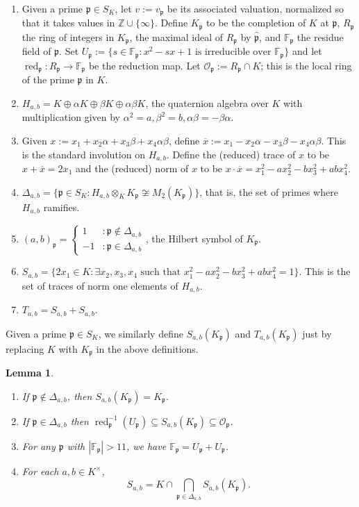 \documentclass[12pt,reqno]{amsart}
\newcommand{\OO}{\mathcal{O}}
\newcommand{\ZZ}{\mathbb{Z}}
\newcommand{\FF}{\mathbb{F}}
\newcommand{\pp}{\mathfrak{p}}
\DeclareMathOperator{\red}{red}
\newtheorem{lem}[thm]{Lemma}
\theoremstyle{definition}
\begin{document}
\begin{enumerate}
\item Given a prime $\pp\in S_K$, let $v:=v_{\pp}$ be its associated
  valuation, normalized so that it takes values in
  $\ZZ\cup\{\infty\}$. Define $K_{\pp}$ to be the completion of $K$ at
  $\pp$, $R_{\pp}$ the ring of integers in $K_{\pp}$, the maximal
  ideal of $R_{\pp}$ by $\hat{\pp}$, and $\FF_{\pp}$ the residue field
  of $\pp$. Set
  $U_{\pp}:=\{s\in \FF_{\pp}: x^2-sx+1 \text{ is irreducible over }
  \FF_{\pp}\}$ and let $\red_{\pp}:R_{\pp}\to \FF_{\pp}$ be the
  reduction map. Let $\OO_{\pp}:=R_{\pp}\cap K$; this is the local
  ring of the prime $\pp$ in $K$.
\item $H_{a,b}=K\oplus \alpha K \oplus \beta K \oplus \alpha\beta K$, the quaternion algebra over $K$ with multiplication given by $\alpha^2=a,\beta^2=b,\alpha\beta=-\beta\alpha$. 
\item Given $x:=x_1+x_2\alpha+x_3\beta +x_4\alpha\beta$, define $\overline{x}:=x_1-x_2\alpha-x_3\beta-x_4\alpha\beta$. This is the standard involution on $H_{a,b}$. Define the (reduced) trace of $x$ to be $x+\overline{x}=2x_1$ and the (reduced) norm of $x$ to be $x\cdot \overline{x}=x_1^2-ax_2^2-bx_3^2+abx_4^2$. 
\item $\Delta_{a,b}=\{\pp\in S_K: H_{a,b}\otimes_K K_{\pp}\not\cong M_2(K_{\pp})\}$, that is, the set of primes where $H_{a,b}$ ramifies. 
\item $(a,b)_{\pp}=\begin{cases} 1 &: \pp \not\in \Delta_{a,b} \\ -1  &: \pp\in \Delta_{a,b}\end{cases}$, the Hilbert symbol of $K_{\pp}$. 
\item $S_{a,b} = \{2x_1\in K: \exists x_2,x_3,x_4 \text{ such that } x_1^2-ax_2^2-bx_3^2+abx_4^2=1\}$. This is the set of traces of norm one elements of $H_{a,b}$. 
\item $T_{a,b} = S_{a,b}+S_{a,b}$.
\end{enumerate}

Given a prime $\pp\in S_K$, we similarly define $S_{a,b}(K_{\pp})$ and $T_{a,b}(K_{\pp})$ just by replacing $K$ with $K_{\pp}$ in the above definitions.

\begin{lem}\label{facts}
$\left.\right.$
\begin{enumerate}
\item If $\pp\not\in \Delta_{a,b}$, then $S_{a,b}(K_{\pp})=K_{\pp}$.
\item If $\pp\in \Delta_{a,b}$ then $\red_{\pp}^{-1}(U_{\pp})\subseteq S_{a,b}(K_{\pp})\subseteq \OO_{\pp}$. 
\item For any $\pp$ with $|\FF_{\pp}|>11$, we have $\FF_{\pp}=U_{\pp}+U_{\pp}$.
\item For each $a,b\in K^{\times}$, 
\[
S_{a,b}=K\cap \bigcap_{\pp\in \Delta_{a,b}} S_{a,b}(K_{\pp}).
\]
\end{enumerate}
\end{lem}
\end{document}
